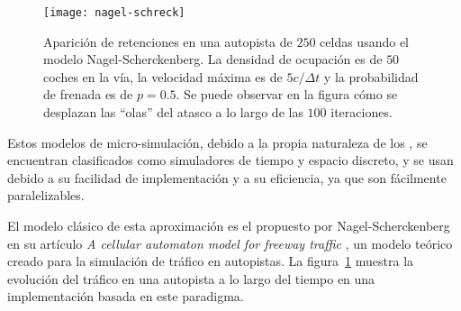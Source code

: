 \begin{figure}[t]
	\centering
	\texttt{[image: nagel-schreck]}
	\caption[Ejemplo de efecto de ondas de choque en simulación de tipo Nagel-Scherckenberg]{Aparición de retenciones en una autopista de $250$ celdas usando el modelo Nagel-Scherckenberg. La densidad de ocupación es de $50$ coches en la vía, la velocidad máxima es de $5 c/\Delta t$ y la probabilidad de frenada es de $p = 0.5$. Se puede observar en la figura cómo se desplazan las \enquote{olas} del atasco a lo largo de las $100$ iteraciones.}
	\label{fig:nagel-schreck}
\end{figure}


Estos modelos de micro-simulación, debido a la propia naturaleza de los , se encuentran clasificados como simuladores de tiempo y espacio discreto, y se usan debido a su facilidad de implementación y a su eficiencia, ya que son fácilmente paralelizables.

El modelo clásico de esta aproximación es el propuesto por Nagel-Scherckenberg en su artículo \textit{A cellular automaton model for freeway traffic} \cite{Nagel1992}, un modelo teórico creado para la simulación de tráfico en autopistas. La figura~\ref{fig:nagel-schreck} muestra la evolución del tráfico en una autopista a lo largo del tiempo en una implementación basada en este paradigma.

